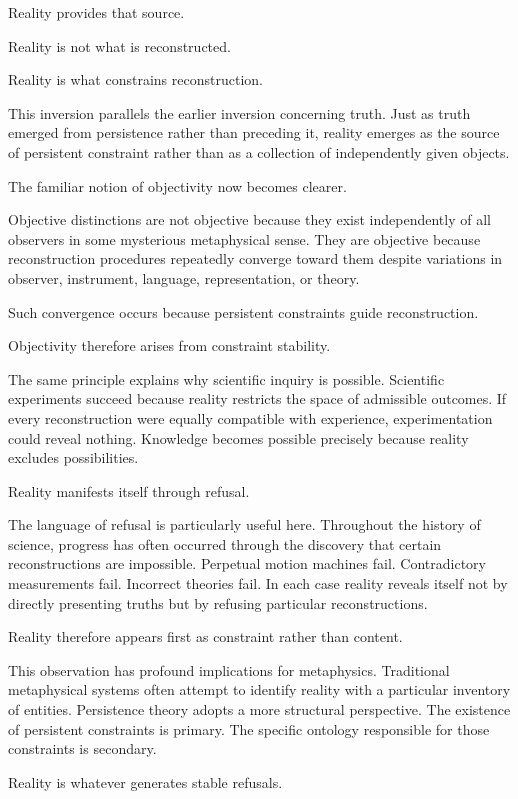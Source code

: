 \documentclass[12pt,oneside]{article}
\theoremstyle{definition}
\begin{document}
Reality provides that source.

Reality is not what is reconstructed.

Reality is what constrains reconstruction.

This inversion parallels the earlier inversion concerning truth. Just as truth emerged from persistence rather than preceding it, reality emerges as the source of persistent constraint rather than as a collection of independently given objects.

The familiar notion of objectivity now becomes clearer.

Objective distinctions are not objective because they exist independently of all observers in some mysterious metaphysical sense. They are objective because reconstruction procedures repeatedly converge toward them despite variations in observer, instrument, language, representation, or theory.

Such convergence occurs because persistent constraints guide reconstruction.

Objectivity therefore arises from constraint stability.

The same principle explains why scientific inquiry is possible. Scientific experiments succeed because reality restricts the space of admissible outcomes. If every reconstruction were equally compatible with experience, experimentation could reveal nothing. Knowledge becomes possible precisely because reality excludes possibilities.

Reality manifests itself through refusal.

The language of refusal is particularly useful here. Throughout the history of science, progress has often occurred through the discovery that certain reconstructions are impossible. Perpetual motion machines fail. Contradictory measurements fail. Incorrect theories fail. In each case reality reveals itself not by directly presenting truths but by refusing particular reconstructions.

Reality therefore appears first as constraint rather than content.

This observation has profound implications for metaphysics. Traditional metaphysical systems often attempt to identify reality with a particular inventory of entities. Persistence theory adopts a more structural perspective. The existence of persistent constraints is primary. The specific ontology responsible for those constraints is secondary.

Reality is whatever generates stable refusals.
\end{document}
